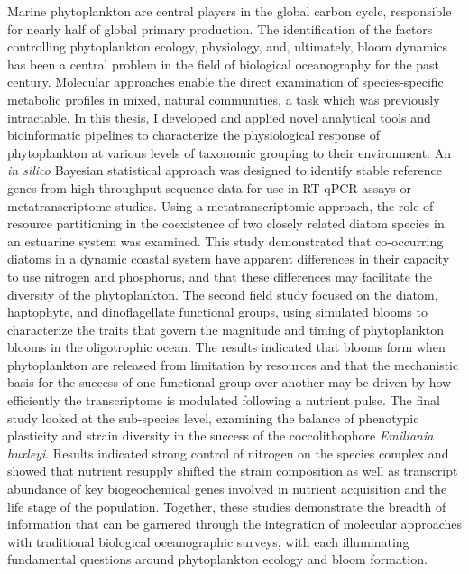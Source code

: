 Marine phytoplankton are central players in the global carbon cycle, responsible for nearly half of global primary production. The identification of the factors controlling phytoplankton ecology, physiology, and, ultimately, bloom dynamics has been a central problem in the field of biological oceanography for the past century. Molecular approaches enable the direct examination of species-specific metabolic profiles in mixed, natural communities, a task which was previously intractable. In this thesis, I developed and applied novel analytical tools and bioinformatic pipelines to characterize the physiological response of phytoplankton at various levels of taxonomic grouping to their environment. An \textit{in silico} Bayesian statistical approach was designed to identify stable reference genes from high-throughput sequence data for use in RT-qPCR assays or metatranscriptome studies. Using a metatranscriptomic approach, the role of resource partitioning in the coexistence of two closely related diatom species in an estuarine system was examined. This study demonstrated that co-occurring diatoms in a dynamic coastal system have apparent differences in their capacity to use nitrogen and phosphorus, and that these differences may facilitate the diversity of the phytoplankton. The second field study focused on the diatom, haptophyte, and dinoflagellate functional groups, using simulated blooms to characterize the traits that govern the magnitude and timing of phytoplankton blooms in the oligotrophic ocean. The results indicated that blooms form when phytoplankton are released from limitation by resources and that the mechanistic basis for the success of one functional group over another may be driven by how efficiently the transcriptome is modulated following a nutrient pulse. The final study looked at the sub-species level, examining the balance of phenotypic plasticity and strain diversity in the success of the coccolithophore \textit{Emiliania huxleyi}. Results indicated strong control of nitrogen on the species complex and showed that nutrient resupply shifted the strain composition as well as transcript abundance of key biogeochemical genes involved in nutrient acquisition and the life stage of the population. Together, these studies demonstrate the breadth of information that can be garnered through the integration of molecular approaches with traditional biological oceanographic surveys, with each illuminating fundamental questions around phytoplankton ecology and bloom formation.





